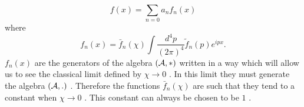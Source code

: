 \documentclass[a4paper,12pt]{article}
\begin{document}
\begin{equation}
f(x)=\sum_{n=0}a_{n}f_{n}(x)
\end{equation}
where
\begin{equation}
f_{n}(x) = \bar{f}_{n}(\chi)\int
\frac{d^4p}{(2{\pi})^4}\tilde{f}_{n}(p) e^{ipx}.
\end{equation}
$f_{n}(x)$ are the generators of the algebra $({\cal A},*)$
written in a way which will allow us to see the classical limit
defined by ${\chi}{\longrightarrow}0$ . In this limit they must
generate the algebra $ ({\cal A},.)$ . Therefore the functions
$\bar{f}_{n}(\chi)$ are such that they tend to a constant when
${\chi}{\longrightarrow}0$ . This constant can always be chosen to
be $1$  .

\vskip 5mm
\vskip 5mm
\noindent
\end{document}
